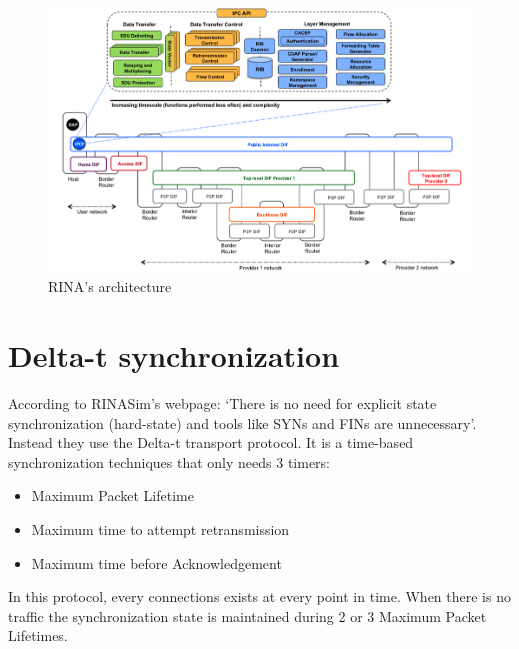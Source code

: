 \documentclass[a4paper]{proc}
\begin{document}
\begin{figure}
    \centering\includegraphics[width=\columnwidth]{arch.png}\caption{RINA's architecture}\label{fig:arch}
\end{figure}

\section{Delta-t synchronization}
According to RINASim's webpage: `There is no need for explicit state synchronization (hard-state) and tools like SYNs and FINs are unnecessary'.
Instead they use the Delta-t transport protocol\cite{65288}.
It is a time-based synchronization techniques that only needs 3 timers:
\begin{itemize}
    \item Maximum Packet Lifetime
    \item Maximum time to attempt retransmission
    \item Maximum time before Acknowledgement
\end{itemize}
In this protocol, every connections exists at every point in time.
When there is no traffic the synchronization state is maintained during 2 or 3 Maximum Packet Lifetimes.\cite{rinasim}
\end{document}
